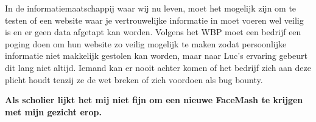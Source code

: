 \documentclass[
]{article}
\begin{document}
In de informatiemaatschappij waar wij nu leven, moet het mogelijk zijn
om te testen of een website waar je vertrouwelijke informatie in moet
voeren wel veilig is en er geen data afgetapt kan worden. Volgens het
WBP moet een bedrijf een poging doen om hun website zo veilig mogelijk
te maken zodat persoonlijke informatie niet makkelijk gestolen kan
worden, maar naar Luc's ervaring gebeurt dit lang niet altijd. Iemand
kan er nooit achter komen of het bedrijf zich aan deze plicht houdt
tenzij ze de wet breken of zich voordoen als bug bounty.

\textbf{Als scholier lijkt het mij niet fijn om een nieuwe FaceMash te
krijgen met mijn gezicht erop.}

\hypertarget{referenties}{%
}
\end{document}
